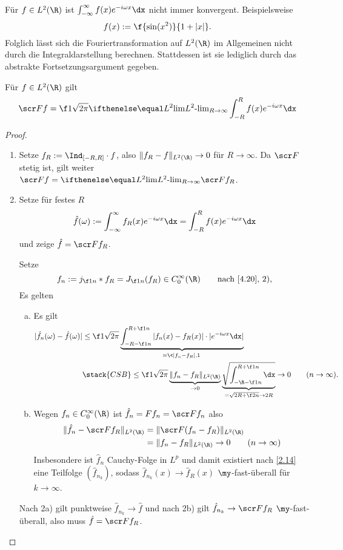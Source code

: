 \begin{nt} \label{4.22}
	Für $f \in L^2(\R)$ ist $\int_{-\infty}^\infty f(x) e^{-i \omega x} \dx$ nicht immer konvergent.
	Beispielsweise
	\[
		f(x) :=  \f{\sin(x^2)}{1+|x|}.
	\]
	Folglich lässt sich die Fouriertransformation auf $L^2(\R)$ im Allgemeinen nicht durch die Integraldarstellung berechnen.
	Stattdessen ist sie lediglich durch das abstrakte Fortsetzungsargument gegeben.
\end{nt}

\begin{st} \label{4.23}
	Für $f \in L^2(\R)$ gilt
	\[
		\scr F f = \f 1{\sqrt{2\pi}} \lim[L^2]_{R\to\infty} \int_{-R}^R f(x)e^{-i\omega x} \dx
	\]
	\begin{proof}
		\begin{enumerate}[1)]
			\item
				Setze $f_R := \Ind_{[-R,R]} \cdot f$, also $\|f_R - f\|_{L^2(\R)} \to 0$ für $R \to \infty$.
				Da $\scr F$ stetig ist, gilt weiter $\scr F f = \lim[L^2]_{R\to\infty} \scr F f_R$.
			\item
				Setze für festes $R$
				\[
					\hat f(\omega)  := \int_{-\infty}^\infty f_R(x) e^{-i\omega x} \dx
					= \int_{-R}^R f(x) e^{-i\omega x} \dx
				\]
				und zeige $\hat f = \scr F f_R$.

				Setze
				\[
					f_n := j_{\f 1n} \ast f_R
					= J_{\f 1n} (f_R) \in C_0^\infty(\R) \qquad \text{nach \ref{4.20}, 2)},
				\]
				Es gelten
				\begin{enumerate}[a)]
					\item
						Es gilt
						\begin{align*}
							|\hat f_n(\omega) - \hat f(\omega)|
							& \le \f 1{\sqrt{2\pi}} \underbrace{\int_{-R-\f 1n}^{R+\f 1n} |f_n(x) - f_R(x)|\cdot |e^{-i\omega x} \dx|}_{= \<|f_n-f_R|,1\>} \\
							&\stack{CSB}\le \f 1{\sqrt{2\pi}} \underbrace{\|f_n - f_R\|_{L^2(\R)}}_{\to 0} \underbrace{\sqrt{\int_{-\R-\f 1n}^{R+\f 1n} \dx}}_{= \sqrt{2R + \f 2n} \to 2R}
							\to 0 \qquad (n\to \infty).
						\end{align*}
					\item
						Wegen $f_n \in C_0^\infty(\R)$ ist $\hat f_n = F f_n = \scr F f_n$ also
						\begin{align*}
							\|\hat f_n - \scr F f_R\|_{L^2(\R)}
							&= \|\scr F(f_n -f_R)\|_{L^2(\R)} \\
							&= \|f_n - f_R\|_{L^2(\R)}
							\to 0 \qquad (n\to \infty)
						\end{align*}
						Insbesondere ist $\hat f_n$ Cauchy-Folge in $L^p$ und damit existiert nach \ref{2.14} eine Teilfolge $(\hat f_{n_k})$, sodass $\hat f_{n_k}(x) \to \hat f_R(x)$ $\my$-fast-überall für $k\to \infty$.
				\end{enumerate}
				Nach 2a) gilt punktweise $\hat f_{n_k} \to \hat f$ und nach 2b) gilt $\hat f_{n_k} \to \scr F f_R$ $\my$-fast-überall, also muss $\hat f = \scr F f_R$.
		\end{enumerate}
	\end{proof}
\end{st}

